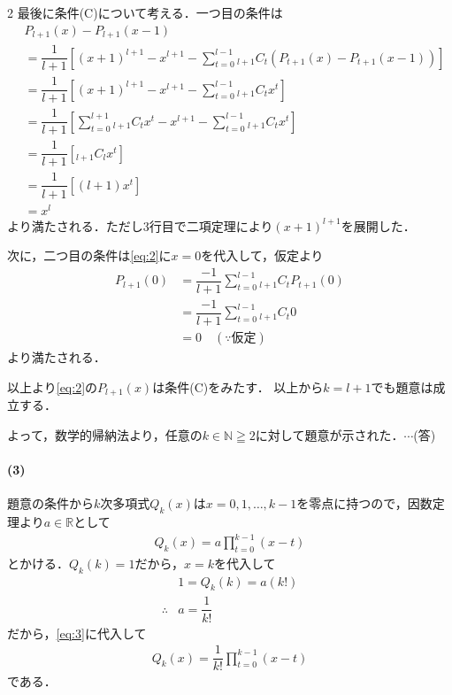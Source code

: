 \documentclass[../../main.tex]{subfiles}
\begin{document}
\begin{multicols}{2}
  最後に条件(C)について考える．一つ目の条件は
  \begin{align}
    & P_{l+1}(x) - P_{l+1}(x-1)                                                                                                  \\
    & = \dfrac{1}{l+1} \left[ (x+1)^{l+1} - x^{l+1} - \sum_{t=0}^{l-1} {}_{l+1}C_{t} \left(P_{t+1}(x)-P_{t+1}(x-1)\right) \right] \\
    & = \dfrac{1}{l+1} \left[ (x+1)^{l+1} - x^{l+1} - \sum_{t=0}^{l-1} {}_{l+1}C_{t} x^{t} \right]                                \\
    & = \dfrac{1}{l+1} \left[ \sum_{t=0}^{l+1} {}_{l+1}C_{t} x^{t} - x^{l+1} - \sum_{t=0}^{l-1} {}_{l+1}C_{t} x^{t} \right]       \\
    & = \dfrac{1}{l+1} \left[ {}_{l+1}C_{l} x^{t} \right]                                                                         \\
    & = \dfrac{1}{l+1} \left[ (l+1) x^{t} \right]                                                                                 \\
    & = x^l
  \end{align}
  より満たされる．ただし3行目で二項定理により$(x+1)^{l+1}$を展開した．

  次に，二つ目の条件は\cref{eq:2}に$x=0$を代入して，仮定より
  \begin{align}
    P_{l+1}(0)
    & = \dfrac{-1}{l+1} \sum_{t=0}^{l-1} {}_{l+1} C_{t} P_{t+1}(0) \\
    & = \dfrac{-1}{l+1} \sum_{t=0}^{l-1} {}_{l+1} C_{t} 0          \\
    & = 0 \quad (\because \text{仮定})
  \end{align}
  より満たされる．

  以上より\cref{eq:2}の$P_{l+1}(x)$は条件(C)をみたす．
  以上から$k=l+1$でも題意は成立する．

  よって，数学的帰納法より，任意の$k\in\mathbb{N}\geqq 2$に対して題意が示された．$\cdots$(答)

  \paragraph{(3)}
  題意の条件から$k$次多項式$Q_k(x)$は$x=0, 1, \dots, k-1$を零点に持つので，因数定理より$a \in \mathbb{R}$として
  \begin{align}
    Q_k(x) = a \prod_{t=0}^{k-1} (x-t) \label{eq:3}
  \end{align}
  とかける．$Q_{k}(k)=1$だから，$x=k$を代入して
  \begin{align}
    & 1 = Q_{k}(k) =  a (k!) \\
    \therefore
    & a = \dfrac{1}{k!}
  \end{align}
  だから，\cref{eq:3}に代入して
  \begin{align}
    Q_k(x) = \dfrac{1}{k!} \prod_{t=0}^{k-1} (x-t) \label{eq:4}
  \end{align}
  である．


\end{multicols}
\end{document}
